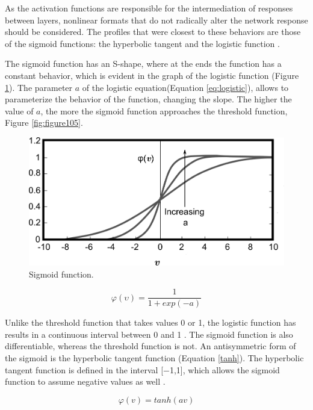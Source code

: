 As the activation functions are responsible for the intermediation of responses between layers, nonlinear formats that do not radically alter the network response should be considered. The profiles that were closest to these behaviors are those of the sigmoid functions: the hyperbolic tangent and the logistic function \cite{rateke1999}.

The sigmoid function has an S-shape, where at the ends the function has a constant behavior, which is evident in the graph of the logistic function (Figure \ref{fig:figure107}). The parameter $a$ of the logistic equation(Equation \ref{eq:logistic}), allows to parameterize the behavior of the function, changing the slope. The higher the value of $a$, the more the sigmoid function approaches the threshold function, Figure \ref{fig:figure105}.

\begin{figure}
    \centering
    \includegraphics[scale=0.55]{images/figure107.png}
    \caption{Sigmoid function.}
    \label{fig:figure107}
\end{figure}

\begin{equation}
\label{eq:logistic}
\varphi(\upsilon)=
 \frac{1}{1+exp(-a)}
\end{equation}

Unlike the threshold function that takes values 0 or 1, the logistic function has results in a continuous interval between 0 and 1 \cite{haykin1999}. The sigmoid function is also differentiable, whereas the threshold function is not. An antisymmetric form of the sigmoid is the hyperbolic tangent function (Equation \ref{tanh}). The hyperbolic tangent function is defined in the interval [$-$1,1], which allows the sigmoid function to assume negative values as well \cite{haykin1999}.

\begin{equation}
\label{tanh}
\varphi(v)=tanh(av)
\end{equation}


